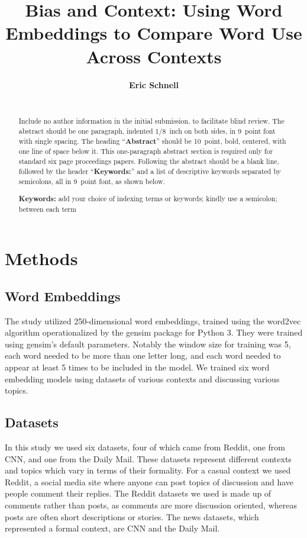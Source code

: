 \documentclass[10pt,letterpaper]{article}
\title{Bias and Context: Using Word Embeddings to Compare Word Use Across Contexts}
\author{{\large \bf Eric Schnell} \\
  
  \AND {\large \bf Ariyo Vahdat} \\}
\begin{document}
\maketitle


\begin{abstract}
Include no author information in the initial submission, to facilitate
blind review.  The abstract should be one paragraph, indented 1/8~inch on both sides,
in 9~point font with single spacing. The heading ``{\bf Abstract}''
should be 10~point, bold, centered, with one line of space below
it. This one-paragraph abstract section is required only for standard
six page proceedings papers. Following the abstract should be a blank
line, followed by the header ``{\bf Keywords:}'' and a list of
descriptive keywords separated by semicolons, all in 9~point font, as
shown below.

\textbf{Keywords:} 
add your choice of indexing terms or keywords; kindly use a
semicolon; between each term
\end{abstract}

\section{Methods}

\subsection{Word Embeddings}

The study utilized 250-dimensional word embeddings, trained using the word2vec algorithm operationalized by the gensim package for Python 3. They were trained using gensim’s default parameters. Notably the window size for training was 5, each word needed to be more than one letter long, and each word needed to appear at least 5 times to be included in the model. We trained six word embedding models using datasets of various contexts and discussing various topics.

\subsection{Datasets}

In this study we used six datasets, four of which came from Reddit, one from CNN, and one from the Daily Mail. These datasets represent different contexts and topics which vary in terms of their formality. For a casual context we used Reddit, a social media site where anyone can post topics of discussion and have people comment their replies. The Reddit datasets we used is made up of comments rather than posts, as comments are more discussion oriented, whereas posts are often short descriptions or stories. The news datasets, which represented a formal context, are CNN and the Daily Mail.
\end{document}
